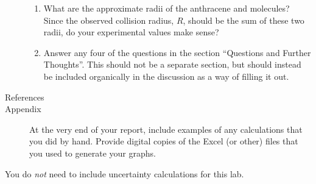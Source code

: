 \documentclass[nobib,nofonts,nols,nohyper]{tufte-handout}
\begin{document}
\begin{description}
\begin{enumerate}
		\item What are the approximate radii of the anthracene and  molecules? 
		Since the observed collision radius, \( R \), should be the sum of these two radii, do your experimental values make sense?
		\item Answer any four of the questions in the section ``Questions and Further Thoughts''. This should not be a separate section, but should instead be included organically in the discussion as a way of filling it out.
	\end{enumerate}
	\item[References]
	\item[Appendix] At the very end of your report, include examples of any calculations that you did by hand. 
	Provide digital copies of the Excel (or other) files that you used to generate your graphs.
\end{description}

\noindent You do \emph{not} need to include uncertainty calculations for this lab. 


\nocite{*}
\printbibliography[category=cited]%

\printbibliography[%
  title={Further Reading},%
  resetnumbers,%
  omitnumbers,%
	notcategory=cited,%
	]
\end{document}
